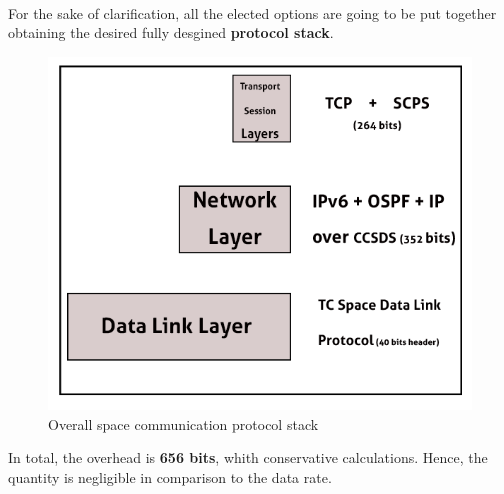 \paragraph{}

For the sake of clarification, all the elected options are going to be put together obtaining the desired fully desgined \textbf{protocol stack}.

\begin{figure}[H]
\centering
\includegraphics[scale=0.8]{./sections/CommunicationsDept/results2}
\caption{Overall space communication protocol stack }
\label{fig:osi}
\end{figure}

In total, the overhead is \textbf{656 bits}, whith conservative calculations. Hence, the quantity is negligible in comparison to the data rate. 